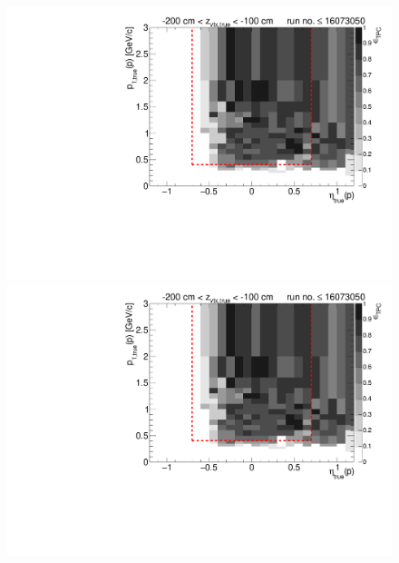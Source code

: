 \begin{figure}[hb]
{  \includegraphics[width=\linewidth,page=16]{graphics/eff/Eff2D_TPC_proton_Minus_RunRange1.pdf}\\
  \includegraphics[width=\linewidth,page=18]{graphics/eff/Eff2D_TPC_proton_Minus_RunRange1.pdf}
}%
\end{figure}


